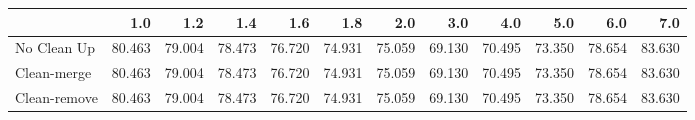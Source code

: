 \begin{tabular}{lrrrrrrrrrrr}
\toprule
{} &    1.0 &    1.2 &    1.4 &    1.6 &    1.8 &    2.0 &    3.0 &    4.0 &    5.0 &    6.0 &    7.0 \\
\midrule
No Clean Up  & 80.463 & 79.004 & 78.473 & 76.720 & 74.931 & 75.059 & 69.130 & 70.495 & 73.350 & 78.654 & 83.630 \\
Clean-merge  & 80.463 & 79.004 & 78.473 & 76.720 & 74.931 & 75.059 & 69.130 & 70.495 & 73.350 & 78.654 & 83.630 \\
Clean-remove & 80.463 & 79.004 & 78.473 & 76.720 & 74.931 & 75.059 & 69.130 & 70.495 & 73.350 & 78.654 & 83.630 \\
\bottomrule
\end{tabular}
